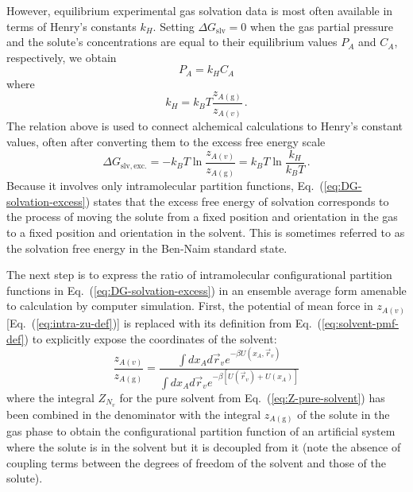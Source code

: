 \documentclass[9pt,bestpractices]{livecoms}
\begin{document}
However, equilibrium experimental gas solvation data is most often available in terms of Henry's constants $k_H$. Setting $\Delta G_{\mathrm{slv}} = 0$ when the gas partial pressure and the solute's concentrations are equal to their equilibrium values $P_A$ and $C_A$, respectively, we obtain
\begin{equation}
  P_A = k_H C_A
  \label{eq:Henrys-law}
\end{equation}
where
\begin{equation}
  k_H = k_B T \frac{z_{A(\mathrm{g})}}{z_{A(v)}} \, .
  \label{eq:Henrys-constant}
\end{equation}
The relation above is used to connect alchemical calculations to Henry's constant values, often after converting them to the excess free energy scale~\cite{nicholls2008predicting,mobley2014freesolv}
\begin{equation}
\Delta G_{\mathrm{slv, exc.}} = - k_B T \ln \frac{z_{A(v)}}{z_{A(\mathrm{g})}} = k_B T \ln \frac{k_H}{k_B T} \, .
\label{eq:DG-solvation-excess}
\end{equation}
Because it involves only intramolecular partition functions, Eq.~(\ref{eq:DG-solvation-excess}) states that the excess free energy of solvation corresponds to the process of moving the solute from a fixed position and orientation in the gas to a fixed position and orientation in the solvent. This is sometimes referred to as the solvation free energy in the Ben-Naim standard state.~\cite{bennaim1984solvation}

The next step is to express the ratio of intramolecular configurational partition functions in Eq.~(\ref{eq:DG-solvation-excess}) in an ensemble average form amenable to calculation by computer simulation. First, the potential of mean force in $z_{A(v)}$ [Eq.~(\ref{eq:intra-zu-def})] is replaced with its definition from Eq.~(\ref{eq:solvent-pmf-def}) to explicitly expose the coordinates of the solvent:
\begin{equation}
  \frac{z_{A(v)}}{z_{A(\mathrm{g})}} =
  \frac{
    \int dx_A d\vec{r}_v e^{-\beta U(x_A, \vec{r}_v)}
  }{
    \int dx_A d\vec{r}_v e^{-\beta [U(\vec{r}_v) + U(x_A)] }
  }
\end{equation}
where the integral $Z_{N_v}$ for the pure solvent from Eq.~(\ref{eq:Z-pure-solvent}) has been combined in the denominator with the integral $z_{A(\mathrm{g})}$ of the solute in the gas phase to obtain the configurational partition function of an artificial system where the solute is in the solvent but it is decoupled from it (note the absence of coupling terms between the degrees of freedom of the solvent and those of the solute).
\end{document}
